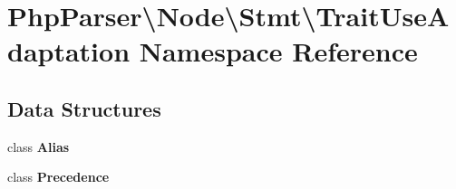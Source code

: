 \section{Php\+Parser\textbackslash{}Node\textbackslash{}Stmt\textbackslash{}Trait\+Use\+Adaptation Namespace Reference}
\label{namespace_php_parser_1_1_node_1_1_stmt_1_1_trait_use_adaptation}
\subsection*{Data Structures}
\begin{DoxyCompactItemize}
\item 
class {\bf Alias}
\item 
class {\bf Precedence}
\end{DoxyCompactItemize}
